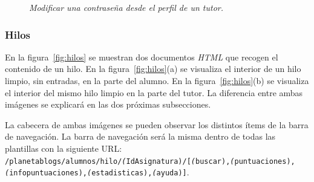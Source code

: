 \documentclass[a4paper, 12pt]{book}
\begin{document}
\begin{figure}
  \centering
  \caption{\textit{Modificar una contrase\~na desde el perfil de un tutor.}}
  \label{fig:resetpass}
\end{figure}


\subsubsection{Hilos} 
\label{sec:hilos}
En la figura~\ref{fig:hilos} se muestran dos documentos \textit{HTML} que recogen el contenido de un hilo. En la figura~\ref{fig:hilos}(a) se visualiza el interior
de un hilo limpio, sin entradas, en la parte del alumno. En la figura~\ref{fig:hilos}(b) se visualiza el interior del mismo hilo limpio en la parte del 
tutor. La diferencia entre ambas im\'agenes se explicar\'a en las dos pr\'oximas subsecciones.

La cabecera de ambas im\'agenes se pueden observar los distintos \'items de la barra de navegaci\'on. La barra de navegaci\'on ser\'a la misma dentro de
todas las plantillas con la siguiente URL:\\
{\scriptsize \texttt{/planetablogs/alumnos/hilo/\textit(IdAsignatura)/[\textit(buscar),\textit(puntuaciones),\textit(infopuntuaciones),\textit(estadisticas),\textit(ayuda)]}}.
\end{document}
